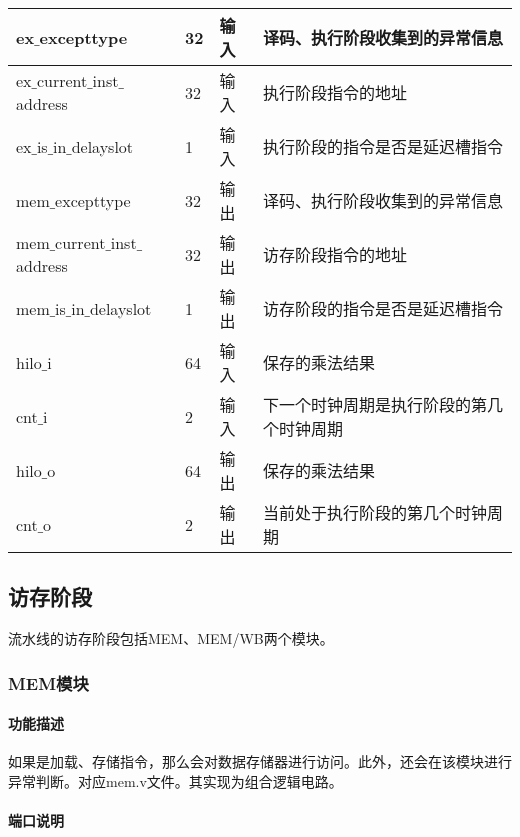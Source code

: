 \begin{table}[H]
	\centering
	\begin{tabular}{|l|l|l|l|}
		\hline
		ex$\_$excepttype & 32 & 输入 & 译码、执行阶段收集到的异常信息 \\
		\hline
		ex$\_$current$\_$inst$\_$address & 32 & 输入 & 执行阶段指令的地址 \\
		\hline
		ex$\_$is$\_$in$\_$delayslot & 1 & 输入 & 执行阶段的指令是否是延迟槽指令 \\
		\hline
		mem$\_$excepttype & 32 & 输出 & 译码、执行阶段收集到的异常信息 \\
		\hline
		mem$\_$current$\_$inst$\_$address & 32 & 输出 & 访存阶段指令的地址 \\
		\hline
		mem$\_$is$\_$in$\_$delayslot & 1 & 输出 & 访存阶段的指令是否是延迟槽指令 \\
		\hline
		hilo$\_$i & 64 & 输入 & 保存的乘法结果 \\
		\hline
		cnt$\_$i & 2 & 输入 & 下一个时钟周期是执行阶段的第几个时钟周期 \\
		\hline
		hilo$\_$o & 64 & 输出 & 保存的乘法结果 \\
		\hline
		cnt$\_$o & 2 & 输出 & 当前处于执行阶段的第几个时钟周期 \\
		\hline
	\end{tabular}
\end{table}
\subsection{访存阶段}
流水线的访存阶段包括MEM、MEM/WB两个模块。
\subsubsection{MEM模块}
\paragraph{功能描述}
\quad

\quad

如果是加载、存储指令，那么会对数据存储器进行访问。此外，还会在该模块进行异常判断。对应mem.v文件。其实现为组合逻辑电路。
\paragraph{端口说明}
\quad

